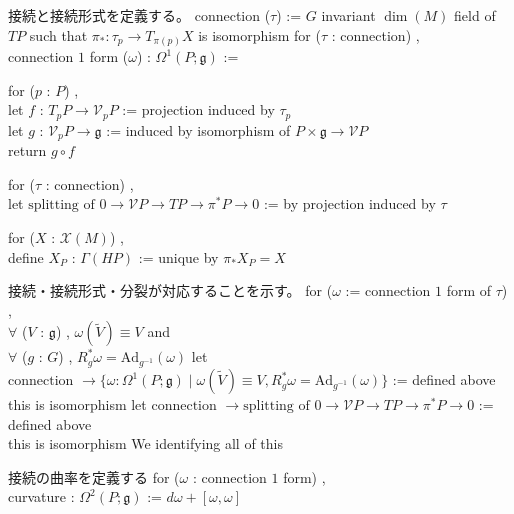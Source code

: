 \begin{Definition}
\itemnote
  接続と接続形式を定義する。
\itemdefi
  connection (\(\tau\)) := \(G\) invariant \(\dim (M)\) field of \(TP\) such that \(\pi_* : \tau_p \to T_{\pi(p)}X\) is isomorphism
\itemdefi
  for (\(\tau\) : connection) ,\\
  connection \(1\) form (\(\omega\)) : \(\Omega^1(P ; \mathfrak{g})\) :=
  \begin{indentblock}
    for (\(p\) : \(P\)) ,\\
    let \(f\) : \(T_p P \to \mathcal{V}_p P\) := projection induced by \(\tau_p\) \\
    let \(g\) : \(\mathcal{V}_p P \to \mathfrak{g}\) := induced by isomorphism of \(P \times \mathfrak{g} \to \mathcal{V}P\) \\
    return \(g \circ f\)
  \end{indentblock}
\itemdefi
  for (\(\tau\) : connection) ,\\
  let \(\text{splitting of } 0 \to \mathcal{V}P \to TP \to \pi^*P \to 0\) := by projection induced by \(\tau\)
\end{Definition}

\begin{Definition}
\itemprop
  for (\(X\) : \(\mathcal{X}(M)\)) ,\\
  define \(X_{P}\) : \(\Gamma(HP)\) := unique by \(\pi_* X_P = X\)
\end{Definition}

\begin{Theorem}
\itemnote
  接続・接続形式・分裂が対応することを示す。
\itemprop
  for (\(\omega\) := connection \(1\) form of \(\tau\)) ,\\
  \(\forall\) (\(V\) : \(\mathfrak{g}\)) , \(\omega(\tilde{V}) \equiv V\) and \\
  \(\forall\) (\(g\) : \(G\)) , \(R_g^* \omega = \text{Ad}_{g^{-1}}(\omega)\)
\itemprop
  let \(\text{connection } \to \{\omega : \Omega^1(P ; \mathfrak{g}) \mid \omega(\tilde{V}) \equiv V , R_g^* \omega = \text{Ad}_{g^{-1}}(\omega)\}\) := defined above \\
  this is isomorphism
\itemprop
  let \(\text{connection } \to \text{splitting of } 0 \to \mathcal{V}P \to TP \to \pi^*P \to 0\) := defined above \\
  this is isomorphism
\itemdefi
  We identifying all of this
\end{Theorem}

\begin{Definition}
\itemnote
  接続の曲率を定義する
\itemdefi
  for (\(\omega\) : connection \(1\) form) ,\\
  curvature : \(\Omega^2(P ; \mathfrak{g})\) := \(d \omega + [\omega , \omega]\)
\end{Definition}

